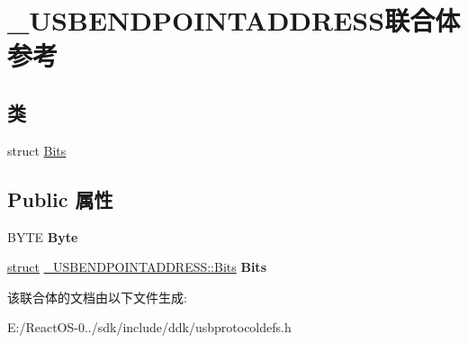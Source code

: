 \hypertarget{union___u_s_b_e_n_d_p_o_i_n_t_a_d_d_r_e_s_s}{}\section{\+\_\+\+U\+S\+B\+E\+N\+D\+P\+O\+I\+N\+T\+A\+D\+D\+R\+E\+S\+S联合体 参考}
\label{union___u_s_b_e_n_d_p_o_i_n_t_a_d_d_r_e_s_s}
\subsection*{类}
\begin{DoxyCompactItemize}
\item 
struct \hyperlink{struct___u_s_b_e_n_d_p_o_i_n_t_a_d_d_r_e_s_s_1_1_bits}{Bits}
\end{DoxyCompactItemize}
\subsection*{Public 属性}
\begin{DoxyCompactItemize}
\item 
\mbox{\label{union___u_s_b_e_n_d_p_o_i_n_t_a_d_d_r_e_s_s_a5cbf60239aa401587d4c1b87e0d00bb7}} 
B\+Y\+TE {\bfseries Byte}
\item 
\mbox{\label{union___u_s_b_e_n_d_p_o_i_n_t_a_d_d_r_e_s_s_a655334849f7c23d2bb53f43a324d426d}} 
\hyperlink{interfacestruct}{struct} \hyperlink{struct___u_s_b_e_n_d_p_o_i_n_t_a_d_d_r_e_s_s_1_1_bits}{\+\_\+\+U\+S\+B\+E\+N\+D\+P\+O\+I\+N\+T\+A\+D\+D\+R\+E\+S\+S\+::\+Bits} {\bfseries Bits}
\end{DoxyCompactItemize}


该联合体的文档由以下文件生成\+:\begin{DoxyCompactItemize}
\item 
E\+:/\+React\+O\+S-\/0../sdk/include/ddk/usbprotocoldefs.\+h\end{DoxyCompactItemize}
